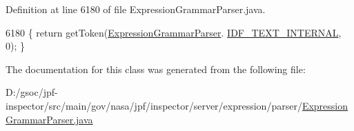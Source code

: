 Definition at line 6180 of file Expression\+Grammar\+Parser.\+java.


\begin{DoxyCode}
6180 \{ \textcolor{keywordflow}{return} getToken(\hyperlink{classgov_1_1nasa_1_1jpf_1_1inspector_1_1server_1_1expression_1_1parser_1_1_expression_grammar_parser}{ExpressionGrammarParser}.
      \hyperlink{classgov_1_1nasa_1_1jpf_1_1inspector_1_1server_1_1expression_1_1parser_1_1_expression_grammar_parser_a015ea22ff7936f8b5cc0e96502fd3abc}{IDF\_TEXT\_INTERNAL}, 0); \}
\end{DoxyCode}


The documentation for this class was generated from the following file\+:\begin{DoxyCompactItemize}
\item 
D\+:/gsoc/jpf-\/inspector/src/main/gov/nasa/jpf/inspector/server/expression/parser/\hyperlink{_expression_grammar_parser_8java}{Expression\+Grammar\+Parser.\+java}\end{DoxyCompactItemize}

